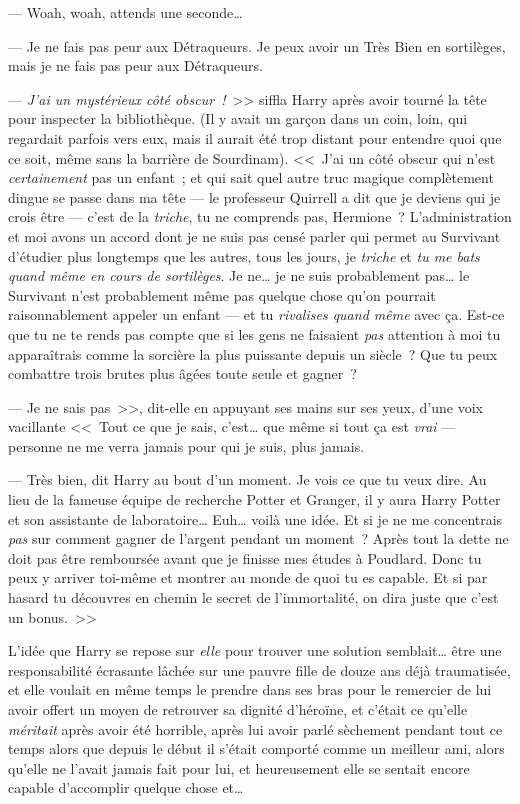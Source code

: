 --- Woah, woah, attends une seconde…

--- Je ne fais pas peur aux Détraqueurs. Je peux avoir un Très Bien en sortilèges, mais je ne fais pas peur aux Détraqueurs.

--- \emph{J'ai un mystérieux côté obscur~!}~>> siffla Harry après avoir tourné la tête pour inspecter la bibliothèque. (Il y avait un garçon dans un coin, loin, qui regardait parfois vers eux, mais il aurait été trop distant pour entendre quoi que ce soit, même sans la barrière de Sourdinam). <<~J'ai un côté obscur qui n'est \emph{certainement} pas un enfant~; et qui sait quel autre truc magique complètement dingue se passe dans ma tête — le professeur Quirrell a dit que je deviens qui je crois être — c'est de la \emph{triche}, tu ne comprends pas, Hermione~? L'administration et moi avons un accord dont je ne suis pas censé parler qui permet au Survivant d'étudier plus longtemps que les autres, tous les jours, je \emph{triche} et \emph{tu me bats quand même en cours de sortilèges}. Je ne… je ne suis probablement pas… le Survivant n'est probablement même pas quelque chose qu'on pourrait raisonnablement appeler un enfant — et tu \emph{rivalises quand même} avec ça. Est-ce que tu ne te rends pas compte que si les gens ne faisaient \emph{pas} attention à moi tu apparaîtrais comme la sorcière la plus puissante depuis un siècle~? Que tu peux combattre trois brutes plus âgées toute seule et gagner~?

--- Je ne sais pas~>>, dit-elle en appuyant ses mains sur ses yeux, d'une voix vacillante <<~Tout ce que je sais, c'est… que même si tout ça est \emph{vrai} — personne ne me verra jamais pour qui je suis, plus jamais.

--- Très bien, dit Harry au bout d'un moment. Je vois ce que tu veux dire. Au lieu de la fameuse équipe de recherche Potter et Granger, il y aura Harry Potter et son assistante de laboratoire… Euh… voilà une idée. Et si je ne me concentrais \emph{pas} sur comment gagner de l'argent pendant un moment~? Après tout la dette ne doit pas être remboursée avant que je finisse mes études à Poudlard. Donc tu peux y arriver toi-même et montrer au monde de quoi tu es capable. Et si par hasard tu découvres en chemin le secret de l'immortalité, on dira juste que c'est un bonus.~>>

L'idée que Harry se repose sur \emph{elle} pour trouver une solution semblait… être une responsabilité écrasante lâchée sur une pauvre fille de douze ans déjà traumatisée, et elle voulait en même temps le prendre dans ses bras pour le remercier de lui avoir offert un moyen de retrouver sa dignité d'héroïne, et c'était ce qu'elle \emph{méritait} après avoir été horrible, après lui avoir parlé sèchement pendant tout ce temps alors que depuis le début il s'était comporté comme un meilleur ami, alors qu'elle ne l'avait jamais fait pour lui, et heureusement elle se sentait encore capable d'accomplir quelque chose et…

